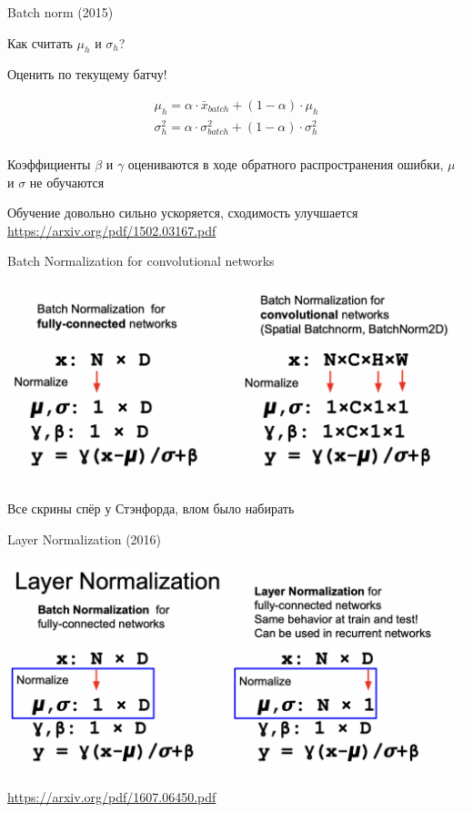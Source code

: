 \documentclass[notes,12pt, aspectratio=169]{beamer}
\newenvironment{wideitemize}{\itemize\addtolength{\itemsep}{10pt}}{\enditemize}
\begin{document}
\begin{frame}{Batch norm (2015)}
	\begin{wideitemize}
		\item  Как считать $\mu_h$ и $\sigma_h$? 
		
		\item Оценить по текущему батчу! 
		
		\begin{align*} 
			\mu_h =  \alpha \cdot \bar x_{batch}  + (1 - \alpha) \cdot \mu_h \\ 
			\sigma^2_h =  \alpha \cdot \sigma^2_{batch}  + (1 - \alpha) \cdot \sigma^2_h \\ 
		\end{align*}
		
		\item Коэффициенты $\beta$ и $\gamma$ оцениваются в ходе обратного распространения ошибки, $\mu$ и $\sigma$ не обучаются
		
		\item Обучение довольно сильно ускоряется, сходимость улучшается 
	\end{wideitemize}
	\vfill %
	\footnotesize
	{\color{blue} \url{https://arxiv.org/pdf/1502.03167.pdf}}
\end{frame}


\begin{frame}{ Batch Normalization for convolutional networks}
	\begin{center}
		\includegraphics[width=.95\linewidth]{st_norm_1.png}
	\end{center}
	\vfill %
	\footnotesize
	Все скрины спёр у Стэнфорда, влом было набирать
\end{frame}



\begin{frame}{Layer Normalization (2016)}
	
	\begin{center}
		\includegraphics[width=.95\linewidth]{st_norm_2.png}
	\end{center}
	\vfill %
	\footnotesize
	{\color{blue} \url{https://arxiv.org/pdf/1607.06450.pdf}}
\end{frame}
\end{document}
